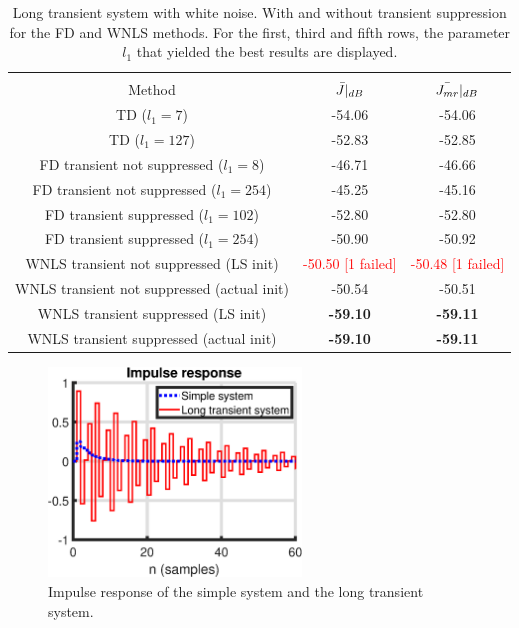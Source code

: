 \begin{table}[H]
\centering
\begin{tabular}{|ccc|}
\hline
&&\\[-2.5ex]
Method & $\Bar{J}|_{dB}$ & $\Bar{J_{mr}}|_{dB}$ \\
\hline
TD ($l_1 = 7$) & -54.06 & -54.06 \\
TD ($l_1 = 127$) &  -52.83 & -52.85 \\
FD transient not suppressed ($l_1 = 8$) & -46.71 & -46.66 \\
FD transient not suppressed ($l_1 = 254$) & -45.25 & -45.16 \\
FD transient suppressed ($l_1 = 102$) & -52.80 & -52.80 \\
FD transient suppressed ($l_1 = 254$) & -50.90 & -50.92 \\
WNLS transient not suppressed (LS init) & \textcolor{red}{-50.50 [1 failed]} & \textcolor{red}{-50.48 [1 failed]} \\
WNLS transient not suppressed (actual init) & -50.54 & -50.51 \\
WNLS transient suppressed (LS init) & \textbf{-59.10} & \textbf{-59.11} \\
WNLS transient suppressed (actual init) & \textbf{-59.10} & \textbf{-59.11} \\
\hline
\end{tabular}
\caption{Long transient system with white noise. With and without transient suppression for the FD and WNLS methods. For the first, third and fifth rows, the parameter $l_1$ that yielded the best results are displayed.}
\label{tab:long_transient_white_transient_with_without_TD_vs_FD_vs_WNLS}
\end{table}

\begin{figure}[H]
\centering
\includegraphics[width = 0.6\textwidth]{figures/impulse_response_simple_long}
\caption{Impulse response of the simple system and the long transient system.}
\label{fig:impulse_simple_long}
\end{figure}

